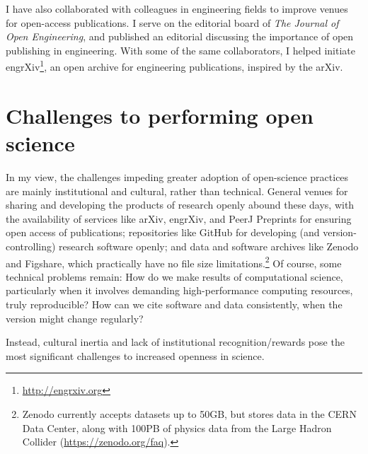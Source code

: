 \documentclass[nobib]{tufte-handout}
\begin{document}
I have also collaborated with colleagues in engineering fields to improve
venues for open-access publications. I serve on the editorial board of
\textit{The Journal of Open Engineering},
and published an editorial discussing the importance of open publishing in
engineering\autocite{TJOE:editorial}. With some of the same collaborators, I
helped initiate engrXiv\footnote{\url{http://engrxiv.org}}, an open archive
for engineering publications, inspired by the arXiv.


\section{Challenges to performing open science}
\label{sec:challenges}

In my view, the challenges impeding greater adoption of open-science practices
are mainly institutional and cultural, rather than technical. General venues for sharing
and developing the products of research openly abound these days, with the availability
of services like arXiv, engrXiv, and PeerJ Preprints for ensuring open access of
publications; repositories like GitHub for developing (and version-controlling)
research software openly; and data and software archives like Zenodo and Figshare,
which practically have no file size limitations.\footnote{Zenodo currently accepts
datasets up to 50GB, but stores data in the CERN Data Center, along with 100PB of
physics data from the Large Hadron Collider (\url{https://zenodo.org/faq}).}
Of course, some technical problems remain: How do we make results of computational
science, particularly when it involves demanding high-performance computing resources,
truly reproducible? How can we cite software and data consistently, when
the version might change regularly?

Instead, cultural inertia and lack of institutional recognition\slash rewards pose
the most significant challenges to increased openness in science.

%
%
\printbibliography
\end{document}
